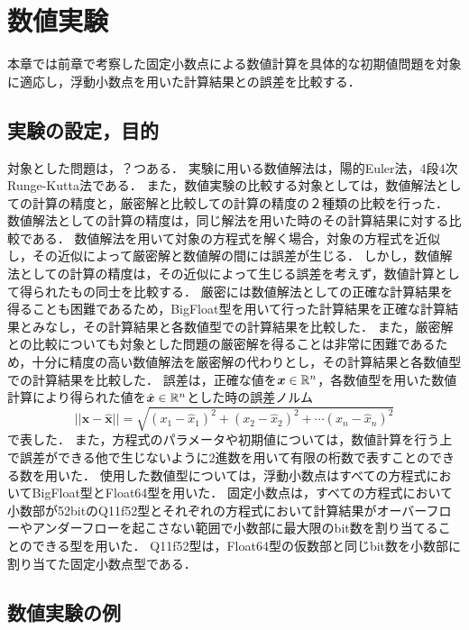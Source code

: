 \chapter{数値実験}
\label{chap:数値実験}
本章では前章で考察した固定小数点による数値計算を具体的な初期値問題を対象に適応し，浮動小数点を用いた計算結果との誤差を比較する．
\section{実験の設定，目的}
対象とした問題は，？つある．
実験に用いる数値解法は，陽的Euler法，4段4次Runge-Kutta法である．
また，数値実験の比較する対象としては，数値解法としての計算の精度と，厳密解と比較しての計算の精度の２種類の比較を行った．
数値解法としての計算の精度は，同じ解法を用いた時のその計算結果に対する比較である．
数値解法を用いて対象の方程式を解く場合，対象の方程式を近似し，その近似によって厳密解と数値解の間には誤差が生じる．
しかし，数値解法としての計算の精度は，その近似によって生じる誤差を考えず，数値計算として得られたもの同士を比較する．
厳密には数値解法としての正確な計算結果を得ることも困難であるため，BigFloat型を用いて行った計算結果を正確な計算結果とみなし，その計算結果と各数値型での計算結果を比較した．
また，厳密解との比較についても対象とした問題の厳密解を得ることは非常に困難であるため，十分に精度の高い数値解法を厳密解の代わりとし，その計算結果と各数値型での計算結果を比較した．
誤差は，正確な値を$\bm{x} \in \mathbb{R}^n$，各数値型を用いた数値計算により得られた値を$\hat{\bm{x}} \in \mathbb{R}^n$とした時の誤差ノルム
\begin{equation}
    ||\bm{x} - \hat{\bm{x}}|| = \sqrt{(x_1 - \hat{x}_1)^2 + (x_2 - \hat{x}_2)^2 + \cdots (x_n - \hat{x}_n)^2}
\end{equation}
で表した．
また，方程式のパラメータや初期値については，数値計算を行う上で誤差ができる他で生じないように2進数を用いて有限の桁数で表すことのできる数を用いた．
使用した数値型については，浮動小数点はすべての方程式においてBigFloat型とFloat64型を用いた．
固定小数点は，すべての方程式において小数部が52bitのQ11f52型とそれぞれの方程式において計算結果がオーバーフローやアンダーフローを起こさない範囲で小数部に最大限のbit数を割り当てることのできる型を用いた．
Q11f52型は，Float64型の仮数部と同じbit数を小数部に割り当てた固定小数点型である．
\section{数値実験の例}
